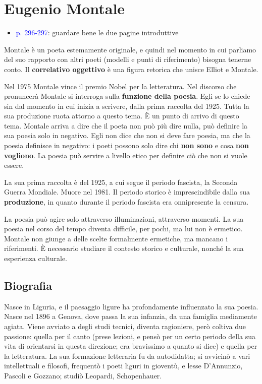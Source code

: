 \documentclass[a4paper, twoside, titlepage]{book}
\newcommand{\elenco}[1]{%
\begin{itemize}
#1
\end{itemize}}
\renewcommand{\emph}[1]{\textcolor{blue}{#1}}
\begin{document}
\chapter{Eugenio Montale}

\elenco{\item \emph{p. 296-297}: guardare bene le due pagine introduttive}

Montale è un poeta estemamente originale, e quindi nel momento in cui parliamo del suo rapporto con altri poeti (modelli e punti di riferimento) bisogna tenerne conto.
Il \textbf{correlativo oggettivo} è una figura retorica che unisce Elliot e Montale.

Nel 1975 Montale vince il premio Nobel per la letteratura. Nel discorso che pronuncerà Montale si interroga sulla \textbf{funzione della poesia}.
Egli se lo chiede sin dal momento in cui inizia a scrivere, dalla prima raccolta del 1925. Tutta la sua produzione ruota attorno a questo tema.
È un punto di arrivo di questo tema. Montale arriva a dire che il poeta non può più dire nulla, può definire la sua poesia solo in negativo. Egli non dice che non si deve fare poesia, ma che la poesia definisce in negativo: i poeti possono solo dire chi \textbf{non sono} e cosa \textbf{non vogliono}. La poesia può servire a livello etico per definire ciò che non si vuole essere.

La sua prima raccolta è del 1925, a cui segue il periodo fascista, la Seconda Guerra Mondiale. Muore nel 1981. Il periodo storico è imprescindibile dalla sua \textbf{produzione}, in quanto durante il periodo fascista era onnipresente la censura.

La poesia può agire solo attraverso illuminazioni, attraverso momenti. La sua poesia nel corso del tempo diventa difficile, per pochi, ma lui non è ermetico.
Montale non giunge a delle scelte formalmente ermetiche, ma mancano i riferimenti. È necessario studiare il contesto storico e culturale, nonché la sua esperienza culturale.

\section{Biografia}

Nasce in Liguria, e il paesaggio ligure ha profondamente influenzato la sua poesia. Nasce nel 1896 a Genova, dove passa la sua infanzia, da una famiglia mediamente agiata. Viene avviato a degli studi tecnici, diventa ragioniere, però coltiva due passione: quella per il canto (prese lezioni, e pensò per un certo periodo della sua vita di orientarsi in questa direzione; era bravissimo a quanto si dice) e quella per la letteratura. La sua formazione letteraria fu da autodidatta; si avvicinò a vari intellettuali e filosofi, frequentò i poeti liguri in gioventù, e lesse D'Annunzio, Pascoli e Gozzano; studiò Leopardi, Schopenhauer.
\end{document}
